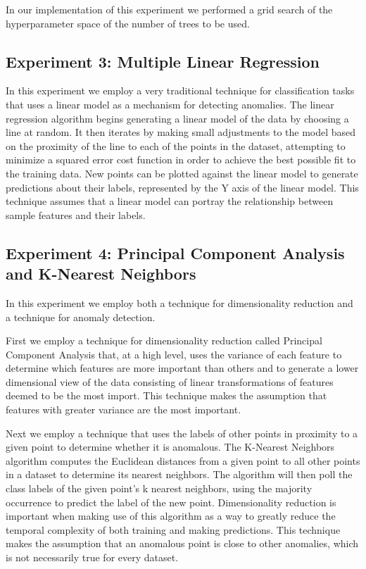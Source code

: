 \documentclass[conference]{IEEEtran}
\begin{document}
In our implementation of this experiment we performed a grid search of the hyperparameter space of the number of trees to be used.

\subsection*{Experiment 3: Multiple Linear Regression}

In this experiment we employ a very traditional technique for classification tasks that uses a linear model as a mechanism for detecting anomalies. The linear regression algorithm begins generating a linear model of the data by choosing a line at random. It then iterates by making small adjustments to the model based on the proximity of the line to each of the points in the dataset, attempting to minimize a squared error cost function in order to achieve the best possible fit to the training data. New points can be plotted against the linear model to generate predictions about their labels, represented by the Y axis of the linear model. This technique assumes that a linear model can portray the relationship between sample features and their labels.

\subsection*{Experiment 4: Principal Component Analysis and K-Nearest Neighbors}

In this experiment we employ both a technique for dimensionality reduction and a technique for anomaly detection.

First we employ a technique for dimensionality reduction called Principal Component Analysis that, at a high level, uses the variance of each feature to determine which features are more important than others and to generate a lower dimensional view of the data consisting of linear transformations of features deemed to be the most import. This technique makes the assumption that features with greater variance are the most important.

Next we employ a technique that uses the labels of other points in proximity to a given point to determine whether it is anomalous. The K-Nearest Neighbors algorithm computes the Euclidean distances from a given point to all other points in a dataset to determine its nearest neighbors. The algorithm will then poll the class labels of the given point's k nearest neighbors, using the majority occurrence to predict the label of the new point. Dimensionality reduction is important when making use of this algorithm as a way to greatly reduce the temporal complexity of both training and making predictions. This technique makes the assumption that an anomalous point is close to other anomalies, which is not necessarily true for every dataset.
\end{document}
